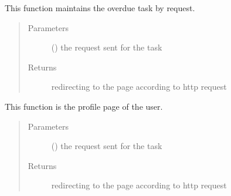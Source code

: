 \documentclass[letterpaper,10pt,english]{sphinxmanual}
\begin{document}
\begin{fulllineitems}
\label{\detokenize{janta:janta.views.overdue_tasks}}
This function maintains the overdue task by request.
\begin{quote}\begin{description}
\item[{Parameters}] \leavevmode
{} () \textendash{} the request sent for the task

\item[{Returns}] \leavevmode
redirecting to the page according to http request

\end{description}\end{quote}

\end{fulllineitems}


\begin{fulllineitems}
\label{\detokenize{janta:janta.views.profile}}
This function is the profile page of the user.
\begin{quote}\begin{description}
\item[{Parameters}] \leavevmode
{} () \textendash{} the request sent for the task

\item[{Returns}] \leavevmode
redirecting to the page according to http request

\end{description}\end{quote}

\end{fulllineitems}

\end{document}
